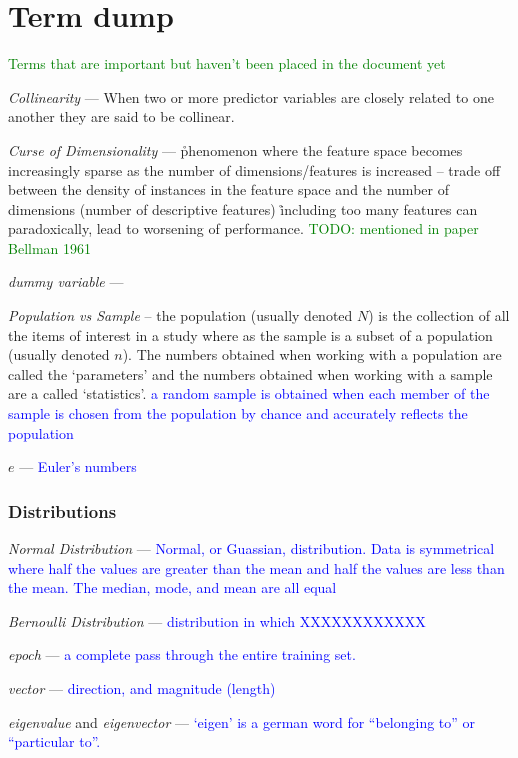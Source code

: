 \chapter{Term dump}

\textcolor{green}{Terms that are important but haven't been placed in the document yet}

\emph{Collinearity} --- When two or more predictor variables are closely related to one another they are said to be collinear.

\emph{Curse of Dimensionality} --- \r{phenomenon where the feature space becomes increasingly sparse as the number of dimensions/features is increased -- trade off between the density of instances in the feature space and the number of dimensions (number of descriptive features) \r{including too many features can paradoxically, lead to worsening of performance.} \textcolor{green}{TODO: mentioned in paper Bellman 1961}}

\emph{dummy variable} ---


\emph{Population vs Sample} -- the population (usually denoted $N$) is the collection of all the items of interest in a study where as the sample is a subset of a population (usually denoted $n$). The numbers obtained when working with a population are called the `parameters' and the numbers obtained when working with a sample are a called `statistics'. \textcolor{blue}{a random sample is obtained when each member of the sample is chosen from the population by chance and accurately reflects the population}

\emph{$e$} --- \textcolor{blue}{Euler's numbers}

\subsection{Distributions}

\emph{Normal Distribution} --- \textcolor{blue}{Normal, or Guassian, distribution. Data is symmetrical where half the values are greater than the mean and half the values are less than the mean. The median, mode, and mean are all equal}

\emph{Bernoulli Distribution} --- \textcolor{blue}{distribution in which XXXXXXXXXXXX}

\emph{epoch} --- \textcolor{blue}{a complete pass through the entire training set.}

\emph{vector} --- \textcolor{blue}{direction, and magnitude (length)}

\emph{eigenvalue} and \emph{eigenvector} --- \textcolor{blue}{`eigen' is a german word for ``belonging to'' or ``particular to''.} 